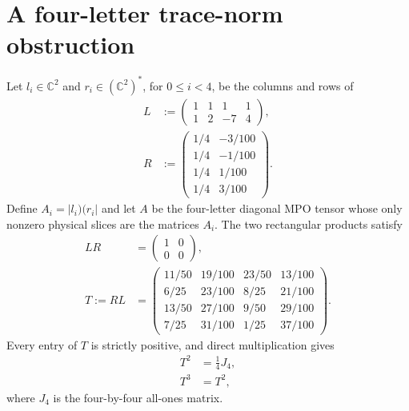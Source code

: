 \documentclass{article}
\begin{document}
\section{A four-letter trace-norm obstruction}

Let $l_i\in\mathbb C^2$ and $r_i\in(\mathbb C^2)^*$, for
$0\leq i<4$, be the columns and rows of
\begin{align}
    L
        &:= \begin{pmatrix}
            1&1&1&1\\
            1&2&-7&4
        \end{pmatrix},
    \label{eq:cpsv16_prop_c15_blocking_channel_false_left_pairing}\\
    R
        &:= \begin{pmatrix}
            1/4&-3/100\\
            1/4&-1/100\\
            1/4& 1/100\\
            1/4& 3/100
        \end{pmatrix}.
    \label{eq:cpsv16_prop_c15_blocking_channel_false_right_pairing}
\end{align}
Define $A_i=|l_i)(r_i|$ and let $A$ be the four-letter diagonal MPO tensor
whose only nonzero physical slices are the matrices $A_i$. The two
rectangular products satisfy
\begin{align}
    LR
        &= \begin{pmatrix}1&0\\0&0\end{pmatrix},
    \label{eq:cpsv16_prop_c15_blocking_channel_false_lr_product}\\
    T:=RL
        &= \begin{pmatrix}
            11/50&19/100&23/50&13/100\\
            6/25&23/100&8/25&21/100\\
            13/50&27/100&9/50&29/100\\
            7/25&31/100&1/25&37/100
        \end{pmatrix}.
    \label{eq:cpsv16_prop_c15_blocking_channel_false_trace_matrix}
\end{align}
Every entry of $T$ is strictly positive, and direct multiplication gives
\begin{align}
    T^2
        &= \frac14 J_4,
    \label{eq:cpsv16_prop_c15_blocking_channel_false_trace_square}\\
    T^3
        &= T^2,
    \label{eq:cpsv16_prop_c15_blocking_channel_false_trace_cube}
\end{align}
where $J_4$ is the four-by-four all-ones matrix.
\end{document}

